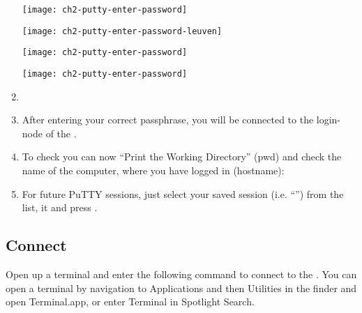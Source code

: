 \begin{enumerate}
\ifantwerpen
      \begin{center}
      \texttt{[image: ch2-putty-enter-password]}
      \end{center}
\fi
\ifleuven
      \begin{center}
      \texttt{[image: ch2-putty-enter-password-leuven]}
      \end{center}
\fi
\ifbrussel
      \begin{center}
      \texttt{[image: ch2-putty-enter-password]}
      \end{center}
\fi
\ifgent
      \begin{center}
      \texttt{[image: ch2-putty-enter-password]}
      \end{center}
\fi

    \item \firsttimeconnection

    \item  After entering your correct passphrase, you will be connected to the
      login-node of the \hpc.
    \item  To check you can now ``Print the Working Directory'' (pwd) and check
      the name of the computer, where you have logged in (hostname):

\begin{prompt}
\end{prompt}

    \item  For future PuTTY sessions, just select your saved session (i.e.
      ``\emph{\hpcname}'') from the list,  it and press
      .
  \end{enumerate}

\fi

\ifmacORlinux

  \subsection{Connect}
  \label{sec:connect}


  Open up a terminal and enter the following command to connect to the \hpc.
  \ifmac
  You can open a terminal by navigation to Applications and then Utilities in the finder and open Terminal.app, or enter Terminal in Spotlight Search.
  \fi


